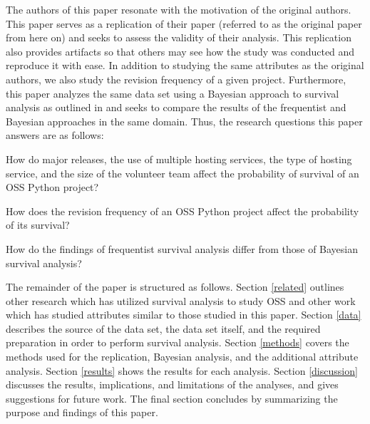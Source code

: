 \documentclass[sigconf,review]{acmart}
\begin{document}
The authors of this paper resonate with the motivation of the original authors. 
This paper serves as a replication of their paper \cite{ali2020cheating} (referred to as the original paper from here on) and seeks to assess the validity of their analysis.
This replication also provides artifacts so that others may see how the study was conducted and reproduce it with ease.
In addition to studying the same attributes as the original authors, we also study the revision frequency of a given project.
Furthermore, this paper analyzes the same data set using a Bayesian approach to survival analysis as outlined in \cite{kelter2020bayesian} and seeks to compare the results of the frequentist and Bayesian approaches in the same domain.
Thus, the research questions this paper answers are as follows:

\begin{questions}
    \item How do major releases, the use of multiple hosting services, the type of hosting service, and the size of the volunteer team affect the probability of survival of an OSS Python project?
    \item How does the revision frequency of an OSS Python project affect the probability of its survival?
    \item How do the findings of frequentist survival analysis differ from those of Bayesian survival analysis?
\end{questions}

The remainder of the paper is structured as follows. 
Section \ref{related} outlines other research which has utilized survival analysis to study OSS and other work which has studied attributes similar to those studied in this paper.
Section \ref{data} describes the source of the data set, the data set itself, and the required preparation in order to perform survival analysis.
Section \ref{methods} covers the methods used for the replication, Bayesian analysis, and the additional attribute analysis.
Section \ref{results} shows the results for each analysis.
Section \ref{discussion} discusses the results, implications, and limitations of the analyses, and gives suggestions for future work.
The final section concludes by summarizing the purpose and findings of this paper.
\end{document}
